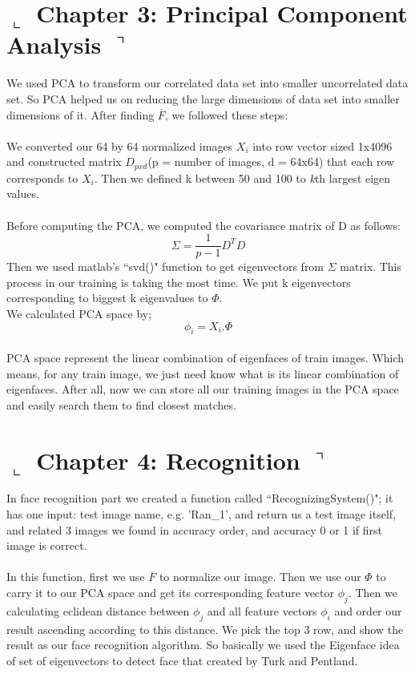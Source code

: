 \documentclass[]{article}
\begin{document}
\section*{ $\llcorner$  Chapter 3: Principal Component Analysis $\urcorner$}
  We used PCA to transform our correlated data set into smaller uncorrelated data set. So PCA helped us on reducing the large dimensions of data set into smaller dimensions of it. After finding $ \overline{F} $, we followed these steps:\\
  \\
  We converted our 64 by 64 normalized images $X_{i}$  into row vector sized 1x4096 and constructed matrix $D_{pxd}$(p = number of images, d = 64x64) that each row corresponds to $X_{i}$. Then we defined k between 50 and 100 to \emph{k}th largest eigen values.\\
  \\Before computing the PCA, we computed the covariance matrix of D as follows:
  	$$ \Sigma = \frac{1}{p-1} D^{T} D $$
  	Then we used matlab's ``svd()" function to get eigenvectors from $ \Sigma $ matrix. This process in our training is taking the most time. We put k eigenvectors corresponding to biggest k eigenvalues to $\Phi$.
  	\\We calculated PCA space by;
  	$$ \phi_{i} = X_{i} . \Phi $$\\
  	
  	PCA space represent the linear combination of eigenfaces of train images. Which means, for any train image, we just need know what is its linear combination of eigenfaces. After all, now we can store all our training images in the PCA space and easily search them to find closest matches.
  

\section*{ $\llcorner$  Chapter 4: Recognition $\urcorner$}
  In face recognition part we created a function called ``RecognizingSystem()"; it has one input: test image name, e.g. 'Ran\_1', and return us a test image itself, and related 3 images we found in accuracy order, and accuracy 0 or 1 if first image is correct.\\
  \\In this function, first we use $ \overline{F} $ to normalize our image. Then we use our $\Phi$ to carry it to our PCA space and get its corresponding feature vector $ \phi_{j} $. Then we calculating eclidean distance between $ \phi_{j} $ and all feature vectors $ \phi_{i} $ and order our result ascending according to this distance. We pick the top 3 row, and show the result as our face recognition algorithm. So basically we used the Eigenface idea of set of eigenvectors to detect face that created by Turk and Pentland.
\end{document}
